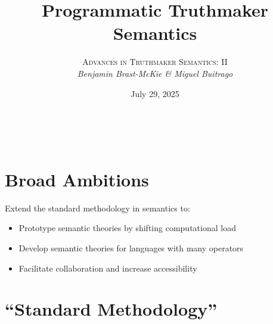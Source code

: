 \documentclass[a4paper, 11pt]{article} %
\title{\textbf{Programmatic Truthmaker Semantics}} %
\author{\textsc{Advances in Truthmaker Semantics: II}\\ \em Benjamin Brast-McKie \& Miguel Buitrago} %
\date{July 29, 2025} %
\makeatletter
\newcommand{\nicebox}[1]{%
  \par\noindent
  \begin{tcolorbox}
    #1
  \end{tcolorbox}
}
\theoremstyle{Pthm}
\renewcommand{\maketitle}{ %
\begin{flushright} %
{\LARGE\@title} %

\vspace{10pt} %

{\@author} %
\\\@date %

\vspace{30pt} %
\end{flushright}
}
\makeatother
\begin{document}
\maketitle %

\thispagestyle{empty}

\vspace{-20pt}


\section*{Broad Ambitions}

\nicebox{
	Extend the standard methodology in semantics to:
  \begin{itemize}
		\item Prototype semantic theories by shifting computational load
    \item Develop semantic theories for languages with many operators
		\item Facilitate collaboration and increase accessibility
	\end{itemize}
}




\section*{``Standard Methodology''}
\end{document}
